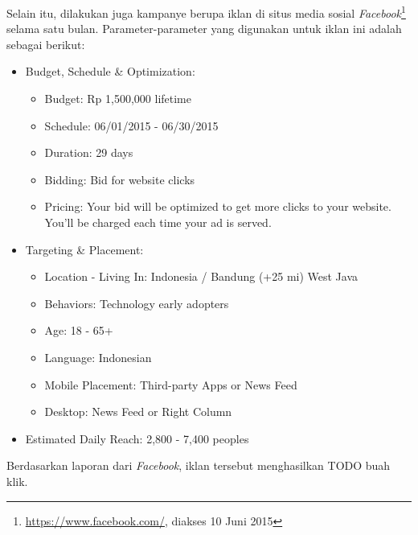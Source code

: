 Selain itu, dilakukan juga kampanye berupa iklan di situs media sosial \textit{Facebook}\footnote{\url{https://www.facebook.com/}, diakses 10 Juni 2015} selama satu bulan. Parameter-parameter yang digunakan untuk iklan ini adalah sebagai berikut:

\begin{itemize}
	\item Budget, Schedule \& Optimization:
	\begin{itemize}
		\item Budget: Rp 1,500,000 lifetime
		\item Schedule: 06/01/2015 - 06/30/2015
		\item Duration: 29 days
		\item Bidding: Bid for website clicks
		\item Pricing: Your bid will be optimized to get more clicks to your website. You'll be charged each time your ad is served.
	\end{itemize}
	\item Targeting \& Placement:
	\begin{itemize}
		\item Location - Living In: Indonesia / Bandung (+25 mi) West Java
		\item Behaviors: Technology early adopters
		\item Age: 18 - 65+
		\item Language: Indonesian
		\item Mobile Placement: Third-party Apps or News Feed
		\item Desktop: News Feed or Right Column
	\end{itemize}
	\item Estimated Daily Reach: 2,800 - 7,400 peoples
\end{itemize}

Berdasarkan laporan dari \textit{Facebook}, iklan tersebut menghasilkan TODO buah klik.